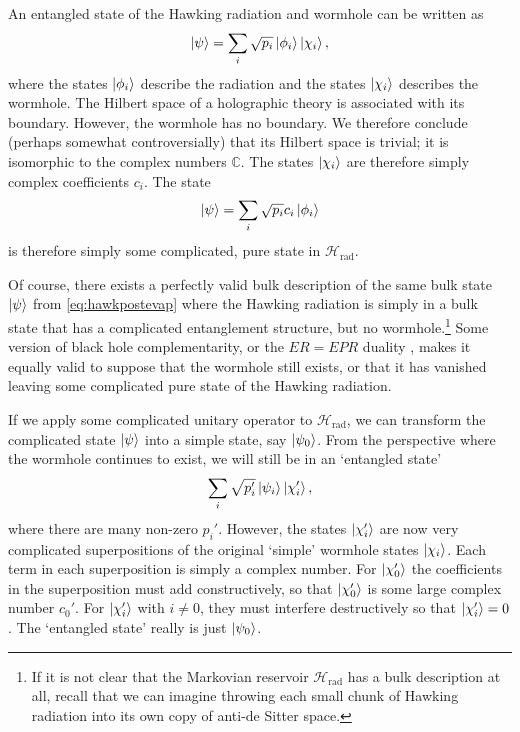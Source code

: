 \documentclass[11pt,a4paper]{article}
\begin{document}
An entangled state of the Hawking radiation and wormhole can be written as
\begin{align} \label{eq:hawkpostevapentangled}
\ket{\psi} = \sum_i \sqrt{p_i} \ket{\phi_i} \ket{\chi_i},
\end{align}
where the states $\ket{\phi_i}$ describe the radiation and the states $\ket{\chi_i}$ describes the wormhole. The Hilbert space of a holographic theory is associated with its boundary. However, the wormhole has no boundary. We therefore conclude (perhaps somewhat controversially) that its Hilbert space is trivial; it is isomorphic to the complex numbers $\mathbb{C}$. The states $\ket{\chi_i}$ are therefore simply complex coefficients $c_i$. The state
\begin{align} \label{eq:hawkpostevap}
\ket{\psi} = \sum_i \sqrt{p_i} c_i \ket{\phi_i}
\end{align}
is therefore simply some complicated, pure state in $\mathcal{H}_\text{rad}$.

Of course, there exists a perfectly valid bulk description of the same bulk state $\ket{\psi}$ from \eqref{eq:hawkpostevap} where the Hawking radiation is simply in a bulk state that has a complicated entanglement structure, but no wormhole.\footnote{If it is not clear that the Markovian reservoir $\mathcal{H}_\text{rad}$ has a bulk description at all, recall that we can imagine throwing each small chunk of Hawking radiation into its own copy of anti-de Sitter space.} Some version of black hole complementarity, or the $ER=EPR$ duality \cite{maldacena2013cool}, makes it equally valid to suppose that the wormhole still exists, or that it has vanished leaving some complicated pure state of the Hawking radiation.

If we apply some complicated unitary operator to $\mathcal{H}_\text{rad}$, we can transform the complicated state $\ket{\psi}$ into a simple state, say $\ket{\psi_0}$. From the perspective where the wormhole continues to exist, we will still be in an `entangled state'
\begin{align}
\sum_i \sqrt{p_i'} \ket{\psi_i} \ket{\chi_i'},
\end{align}
where there are many non-zero $p_i'$. However, the states $\ket{\chi_i'}$ are now very complicated superpositions of the original `simple' wormhole states $\ket{\chi_i}$. Each term in each superposition is simply a complex number. For $\ket{\chi'_0}$ the coefficients in the superposition must add constructively, so that $\ket{\chi'_0}$ is some large complex number $c_0'$. For $\ket{\chi'_i}$ with $i \neq 0$, they must interfere destructively so that $\ket{\chi'_i} = 0$. The `entangled state' really is just $\ket{\psi_0}$.
\end{document}
